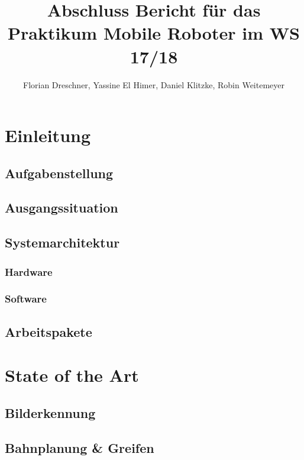 \documentclass[de,ids]{fziartcl}
\author{Florian Dreschner, Yassine El Himer, Daniel Klitzke, Robin Weitemeyer}
\title{Abschluss Bericht für das Praktikum Mobile Roboter im WS 17/18}
\begin{document}
\maketitle

\tableofcontents
\newpage

\section{Einleitung} %
\subsection{Aufgabenstellung}
\subsection{Ausgangssituation}
\subsection{Systemarchitektur}
\subsubsection{Hardware} %

\subsubsection{Software}
\subsection{Arbeitspakete} %

\section{State of the Art} %
\subsection{Bilderkennung}
\subsection{Bahnplanung \& Greifen}
\end{document}
